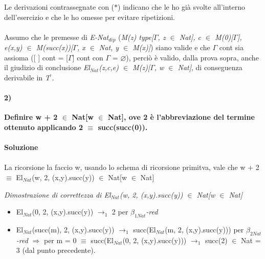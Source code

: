 \vspace{0.5cm}
\noindent
\normalsize Le derivazioni contrassegnate con ($\ast$) indicano che le ho gi\`a svolte all'interno dell'esercizio e che le ho omesse per evitare ripetizioni.\\\\
\noindent
Assumo che le premesse di \textit{E-Nat$_{dip}$} (\textit{M(z) type[$\Gamma$, z $\in$ Nat], c $\in$ M(0)[$\Gamma$], e(x,y) $\in$ M(succ(x))[$\Gamma$, x $\in$ Nat, y $\in$ M(x)]}) siano valide e che $\Gamma$ cont sia assioma ([ ] cont = [$\Gamma$] cont con $\Gamma$ = $\varnothing$), perci\`o \`e valido, dalla prova sopra, anche il giudizio di conclusione \textit{El$_{Nat}$(z,c,e) $\in$ M(z)[$\Gamma$, w $\in$ Nat]}, di conseguenza derivabile in \textit{T$^\backprime$}.

\paragraph{2)}
\textbf{Definire w + 2 $\in$ Nat[w $\in$ Nat], ove 2 \`e l'abbreviazione del termine ottenuto applicando 2 $\equiv$ succ(succ(0)).}
\\\\
\textbf{Soluzione}\\\\
La ricorsione la faccio w, usando lo schema di ricorsione primitva, vale che w + 2 $\equiv$ El$_{Nat}$(w, 2, (x,y).succ(y)) $\in$ Nat[w $\in$ Nat]

\small
\begin{adjustwidth}{-5em}{}
\begin{prooftree}
\end{prooftree}
\end{adjustwidth}
\noindent
\normalsize \textit{Dimostrazione di correttezza di El$_{Nat}$(w, 2, (x,y).succ(y)) $\in$ Nat[w $\in$ Nat]}
\begin{itemize}
\item El$_{Nat}$(0, 2, (x,y).succ(y)) $\rightarrow_1$ 2 per \textit{$\beta_{1Nat}$-red}
\item El$_{Nat}$(succ(m), 2, (x,y).succ(y)) $\rightarrow_1$ succ(El$_{Nat}$(m, 2, (x,y).succ(y))) per \textit{$\beta_{2Nat}$-red} $\Rightarrow$ per m = 0 $\equiv$ succ(El$_{Nat}$(0, 2, (x,y).succ(y))) $\rightarrow_1$ succ(2) $\in$ Nat = 3 (dal punto precedente).
\end{itemize}


